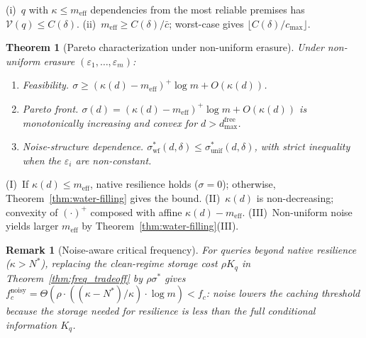 \documentclass[journal]{IEEEtran}
\makeatletter
\newtheorem{theorem}{Theorem}[section]
\newtheorem{remark}{Remark}[section]
\numberwithin{equation}{section}
\renewenvironment{proof}[1][\proofname]{\par
  \pushQED{\qed}%
  \normalfont \topsep6\p@\@plus6\p@\relax
  \trivlist
  \item[\hskip\labelsep
        \itshape
    #1\@addpunct{.}]\ignorespaces
}{%
  \popQED\endtrivlist\@endpefalse
}
\makeatother
\begin{document}
\begin{proof}
(i)~$q$ with $\kappa\le m_{\mathrm{eff}}$ dependencies from the
most reliable premises has $\mathcal{V}(q)\le C(\delta)$.
(ii)~$m_{\mathrm{eff}}\ge C(\delta)/\bar c$; worst-case gives
$\lfloor C(\delta)/c_{\max}\rfloor$.
\end{proof}

\begin{theorem}[Pareto characterization under non-uniform erasure]
\label{thm:pareto-nonuniform}
Under non-uniform erasure $(\varepsilon_1,\ldots,\varepsilon_m)$:

\begin{enumerate}[label=\textup{(\Roman*)}]
\item \emph{Feasibility.}
$\sigma\ge(\kappa(d)-m_{\mathrm{eff}})^+\log m+O(\kappa(d))$.

\item \emph{Pareto front.}
$\sigma(d)=(\kappa(d)-m_{\mathrm{eff}})^+\log m+O(\kappa(d))$
is monotonically increasing and convex for
$d>d_{\max}^{\mathrm{free}}$.

\item \emph{Noise-structure dependence.}
$\sigma^*_{\mathrm{wf}}(d,\delta)
 \le\sigma^*_{\mathrm{unif}}(d,\delta)$,
with strict inequality when the $\varepsilon_i$ are
non-constant.
\end{enumerate}
\end{theorem}

\begin{proof}
(I)~If $\kappa(d)\le m_{\mathrm{eff}}$, native resilience holds
($\sigma=0$); otherwise, Theorem~\ref{thm:water-filling}
gives the bound.
(II)~$\kappa(d)$ is non-decreasing; convexity of $(\cdot)^+$
composed with affine $\kappa(d)-m_{\mathrm{eff}}$.
(III)~Non-uniform noise yields larger $m_{\mathrm{eff}}$ by
Theorem~\ref{thm:water-filling}(III).
\end{proof}

\begin{remark}[Noise-aware critical frequency]
\label{rem:noise-aware-fc}
For queries beyond native resilience ($\kappa>N^*$), replacing
the clean-regime storage cost $\rho K_q$ in
Theorem~\ref{thm:freq_tradeoff} by $\rho\sigma^*$ gives
$f_c^{\mathrm{noisy}}
 =\Theta(\rho\cdot((\kappa{-}N^*)/\kappa)\cdot\log m)
 <f_c$:
noise lowers the caching threshold because the storage needed
for resilience is less than the full conditional information
$K_q$.
\end{remark}
\end{document}

